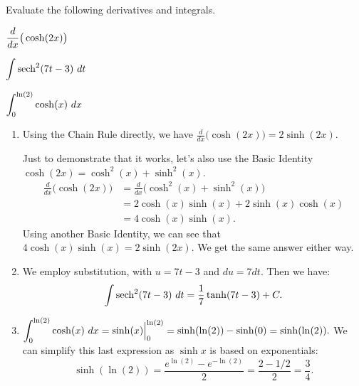 \begin{example} \label{eg:6.8.2} %
Evaluate the following derivatives and integrals.

\begin{enumerate*}[1)]
\item	 $\displaystyle\frac{d}{dx}\big(\cosh (2x)\big)$\hspace{.5cm}
\item	 $\displaystyle\int \operatorname{sech}^2(7t-3)\ dt$\hspace{.5cm}
\item	 $\ds \int_0^{\ln (2)} \cosh (x)\ dx$
\end{enumerate*}

\solution
\begin{enumerate}[1)]
\item Using the Chain Rule directly, we have $\frac{d}{dx} \big(\cosh (2x)\big) = 2\sinh (2x)$.

Just to demonstrate that it works, let's also use the Basic Identity $\cosh (2x) = \cosh^2(x)+\sinh^2(x)$.
\begin{align*}
\frac{d}{dx}\big(\cosh (2x)\big) &= \frac{d}{dx}\big(\cosh^2(x)+\sinh^2(x)\big) \\
&= 2\cosh (x)\sinh (x)+ 2\sinh (x)\cosh (x)\\ 
&= 4\cosh (x)\sinh (x).
\end{align*}
Using another Basic Identity, we can see that $4\cosh (x)\sinh (x) = 2\sinh (2x)$. We get the same answer either way.

\item	  We employ substitution, with $u = 7t-3$ and $du = 7dt$. Then we have:
$$ \int \operatorname{sech}^2 (7t-3)\ dt = \frac17\tanh (7t-3) + C.$$

\item	 $\displaystyle \int_0^{\ln (2)} \cosh (x)\ dx = \sinh (x)\Big|_0^{\ln (2)} = \sinh (\ln (2)) - \sinh (0) = \sinh(\ln (2)).$
\noindent We can simplify this last expression as $\sinh x$ is based on exponentials:
$$\sinh(\ln (2)) = \frac{e^{\ln (2)}-e^{-\ln (2)}}2 = \frac{2-1/2}{2} = \frac34.$$
\end{enumerate}

\end{example}